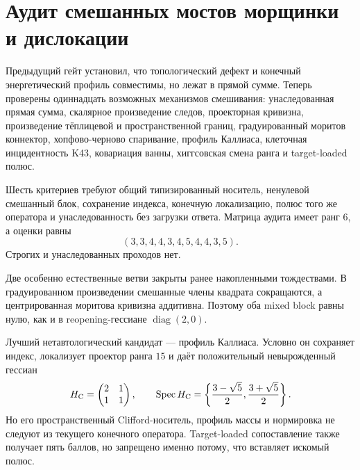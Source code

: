 \chapter{Аудит смешанных мостов морщинки и дислокации}
\label{ch:v10-particle-wrinkle-dislocation-mixed-bridge-audit}

Предыдущий гейт установил, что топологический дефект и конечный
энергетический профиль совместимы, но лежат в прямой сумме. Теперь проверены
одиннадцать возможных механизмов смешивания: унаследованная прямая сумма,
скалярное произведение следов, проекторная кривизна, произведение
тёплицевой и пространственной границ, градуированный моритов коннектор,
хопфово-черново спаривание, профиль Каллиаса, клеточная инцидентность K43,
ковариация ванны, хиггсовская смена ранга и target-loaded полюс.

Шесть критериев требуют общий типизированный носитель, ненулевой смешанный
блок, сохранение индекса, конечную локализацию, полюс того же оператора и
унаследованность без загрузки ответа. Матрица аудита имеет ранг $6$, а
оценки равны
\begin{equation}
 (3,3,4,4,3,4,5,4,4,3,5).
\end{equation}
Строгих и унаследованных проходов нет.

Две особенно естественные ветви закрыты ранее накопленными тождествами.
В градуированном произведении смешанные члены квадрата сокращаются, а
центрированная моритова кривизна аддитивна. Поэтому оба mixed block равны
нулю, как и в reopening-гессиане $\operatorname{diag}(2,0)$.

Лучший нетавтологический кандидат --- профиль Каллиаса. Условно он
сохраняет индекс, локализует проектор ранга $15$ и даёт положительный
невырожденный гессиан
\begin{equation}
 H_{\rm C}=\begin{pmatrix}2&1\\1&1\end{pmatrix},
 \qquad
 \operatorname{Spec}H_{\rm C}
 =\left\{\frac{3-\sqrt5}{2},\frac{3+\sqrt5}{2}\right\}.
\end{equation}
Но его пространственный Clifford-носитель, профиль массы и нормировка не
следуют из текущего конечного оператора. Target-loaded сопоставление также
получает пять баллов, но запрещено именно потому, что вставляет искомый
полюс.

